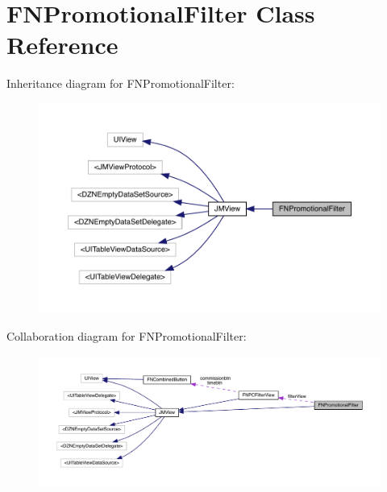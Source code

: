 \hypertarget{interface_f_n_promotional_filter}{}\section{F\+N\+Promotional\+Filter Class Reference}
\label{interface_f_n_promotional_filter}


Inheritance diagram for F\+N\+Promotional\+Filter\+:\nopagebreak
\begin{figure}[H]
\begin{center}
\leavevmode
\includegraphics[width=350pt]{interface_f_n_promotional_filter__inherit__graph}
\end{center}
\end{figure}


Collaboration diagram for F\+N\+Promotional\+Filter\+:\nopagebreak
\begin{figure}[H]
\begin{center}
\leavevmode
\includegraphics[width=350pt]{interface_f_n_promotional_filter__coll__graph}
\end{center}
\end{figure}
